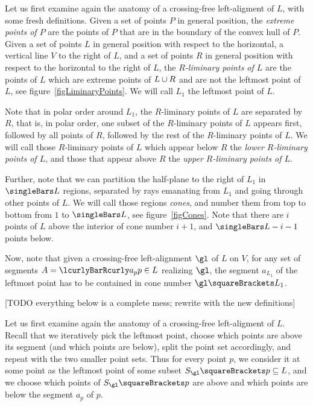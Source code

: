 \documentclass[10pt, a4paper, twoside]{basestyle}
\begin{document}
Let us first examine again the anatomy of a crossing-free left-aligment of $L$, with some fresh definitions.
Given a set of points $P$ in general position, the \emph{extreme points of $P$} are the points of $P$ that
are in the boundary of the convex hull of $P$.
Given a set of points $L$ in general position with respect to the horizontal,
a vertical line $V$ to the right of $L$, and a set of points $R$
in general position with respect to the horizontal to the right of $L$,
the \emph{$R$-liminary points of $L$} are the points of $L$ which are extreme points of $L\cup R$ and
are not the leftmost point of $L$, see figure~\ref{figLiminaryPoints}.
We will call $L_1$ the leftmost point of $L$.

Note that in polar order around $L_1$, the $R$-liminary points of $L$ are separated by
$R$, that is, in polar order, one subset of the $R$-liminary points of $L$ appears first, followed by
all points of $R$, followed by the rest of the $R$-liminary points of $L$.
We will call those $R$-liminary points of $L$ which appear below $R$ the \emph{lower $R$-liminary points of $L$},
and those that appear above $R$ the \emph{upper $R$-liminary points of $L$}.

Further, note that we can partition the half-plane to the right of $L_1$ in $\Cardinality L$ regions,
separated by rays emanating from $L_1$ and going through other points of $L$. We will call those regions
\emph{cones}, and number them from top to bottom from $1$ to $\Cardinality L$, see figure~\ref{figCones}.
Note that there are $i$ points of $L$ above the interior of cone number $i+1$, and $\Cardinality L - i - 1$ points below.

Now, note that given a crossing-free left-alignment $\gl$ of $L$ on $V$, for any set of segments $A=\setst{a_p}{p\in L}$
realizing $\gl$, the segment $a_{L_1}$ of the leftmost point has to be contained in cone number $\gl\of{L_1}$.


[TODO everything below is a complete mess; rewrite with the new definitions]

Let us first examine again the anatomy of a crossing-free left-aligment of $L$. Recall that we iteratively
pick the leftmost point, choose which points are above its segment (and which points are below),
split the point set accordingly, and repeat with the two smaller point sets.
Thus for every point $p$, we consider it at some point as the leftmost point of some subset
$S_\gl\of p \Subset L$, and we choose which points of $S_\gl\of p$ are above and which points are
below the segment $a_p$ of $p$.
\end{document}
